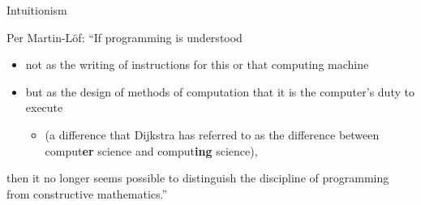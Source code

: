 \documentclass[t,compress,hyperref={hidelinks}]{beamer}
\begin{document}
\begin{frame}{Intuitionism}

Per Martin-Löf: ``If programming is understood
\vspace*{-.5ex}
\begin{itemize}
\item not as the writing of instructions for this or that computing machine
\item but as the design of methods of computation that it is the computer's duty to execute
\vspace*{1ex}
\begin{itemize}
\item (a difference that Dijkstra has referred to as the difference between comput\textbf{er} science and comput\textbf{ing} science),
\end{itemize}
\end{itemize}
\vspace*{-.5ex}
then it no longer seems possible to distinguish the discipline of programming from constructive mathematics.''

\end{frame}
\end{document}
